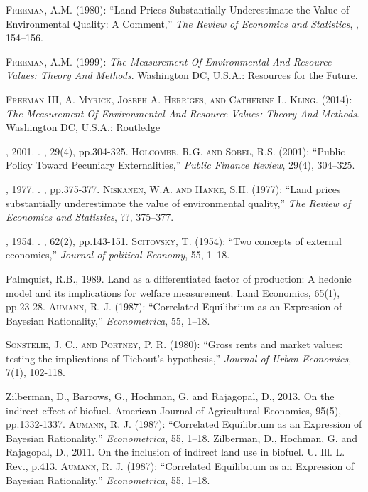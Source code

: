 \documentclass[ecta,nameyear,draft]{econsocart}
\theoremstyle{plain}
\theoremstyle{remark}
\begin{document}
\begin{thebibliography}{}
\textsc{Freeman, A.M.} (1980):
``Land Prices Substantially Underestimate the Value of Environmental Quality: A Comment,''
\textit{The Review of Economics and Statistics}, , 154--156.
\endbibitem


\textsc{Freeman, A.M.} (1999):
\textit{The Measurement Of Environmental And Resource Values: Theory And Methods}.
Washington DC, U.S.A.: Resources for the Future.
\endbibitem
 
\textsc{Freeman III, A. Myrick, Joseph A. Herriges, and Catherine L. Kling.} (2014):
\textit{The Measurement Of Environmental And Resource Values: Theory And Methods}.
Washington DC, U.S.A.: Routledge
\endbibitem 


, 2001. . , 29(4), pp.304-325. 
\textsc{Holcombe, R.G. and Sobel, R.S.} (2001):
``Public Policy Toward Pecuniary Externalities,''
\textit{Public Finance Review}, 29(4), 304--325.
\endbibitem


, 1977. . , pp.375-377.
\textsc{Niskanen, W.A. and Hanke, S.H.} (1977):
``Land prices substantially underestimate the value of environmental quality,''
\textit{The Review of Economics and Statistics}, ??, 375--377.
\endbibitem


, 1954. . , 62(2), pp.143-151. 
\textsc{Scitovsky, T.} (1954):
``Two concepts of external economies,''
\textit{Journal of political Economy}, 55, 1--18.
\endbibitem

Palmquist, R.B., 1989. Land as a differentiated factor of production: A hedonic model and its implications for welfare measurement. Land Economics, 65(1), pp.23-28. 
\textsc{Aumann, R. J.} (1987):
``Correlated Equilibrium as an Expression of Bayesian Rationality,''
\textit{Econometrica}, 55, 1--18.
\endbibitem


\textsc{Sonstelie, J. C., and Portney, P. R.} (1980):
``Gross rents and market values: testing the implications of Tiebout's hypothesis,''
\textit{Journal of Urban Economics}, 7(1), 102-118.
\endbibitem


Zilberman, D., Barrows, G., Hochman, G. and Rajagopal, D., 2013. On the indirect effect of biofuel. American Journal of Agricultural Economics, 95(5), pp.1332-1337. 
\textsc{Aumann, R. J.} (1987):
``Correlated Equilibrium as an Expression of Bayesian Rationality,''
\textit{Econometrica}, 55, 1--18.
\endbibitem
Zilberman, D., Hochman, G. and Rajagopal, D., 2011. On the inclusion of indirect land use in biofuel. U. Ill. L. Rev., p.413. 
\textsc{Aumann, R. J.} (1987):
``Correlated Equilibrium as an Expression of Bayesian Rationality,''
\textit{Econometrica}, 55, 1--18.
\endbibitem


\end{thebibliography}
\end{document}
